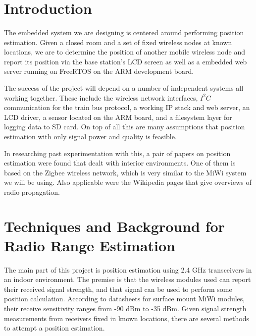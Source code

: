 \documentclass{article}
\begin{document}
\section*{Introduction}
\paragraph*{}
The embedded system we are designing is centered around performing position 
estimation.  Given a closed room and a set of fixed wireless nodes at known
locations, we are to determine the position of another mobile wireless node and
report its position via the base station's LCD screen as well as a embedded web
server running on FreeRTOS on the ARM development board.

The success of the project will depend on a number of independent systems all
working together.  These include the wireless network interfaces, $I^2C$
communication for the train bus protocol, a working IP stack and web server, an
LCD driver, a sensor located on the ARM board, 
and a filesystem layer for logging data to SD card.  On top of all
this are many assumptions that position estimation with only signal power
and quality is feasible.

In researching past experimentation with this, a pair of papers on position
estimation were found that dealt with interior environments.  One of them
is based on the Zigbee wireless network, which is very similar to the MiWi 
system we will be using.  Also applicable were the {W}ikipedia pages that give
overviews of radio propagation.


\section*{Techniques and Background for Radio Range Estimation}
\paragraph*{}
The main part of this project is position estimation using 2.4 GHz transceivers in an indoor environment.  The premise is that the wireless modules used can report their received signal strength, and that signal can be used to perform some position calculation.  According to datasheets for surface mount MiWi modules, their receive sensitivity ranges from -90 dBm to -35 dBm.  Given signal strength measurements from receivers fixed in known locations, there are several methods to attempt a position estimation.
\end{document}
